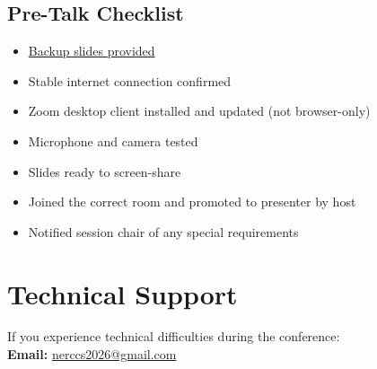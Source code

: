 \documentclass[11pt]{article}
\begin{document}
\subsection{Pre-Talk Checklist}
\begin{itemize}
	\item[$\square$] \href{https://forms.gle/S6GBNdRkcAE43YWo7}{Backup slides 
	provided} 
    \item[$\square$] Stable internet connection confirmed
    \item[$\square$] Zoom desktop client installed and updated (not browser-only)
    \item[$\square$] Microphone and camera tested
    \item[$\square$] Slides ready to screen-share
    \item[$\square$] Joined the correct room and promoted to presenter by host
    \item[$\square$] Notified session chair of any special requirements
\end{itemize}

\section{Technical Support}

If you experience technical difficulties during the conference:\\[0.3em]
\textbf{Email:} \href{mailto:nerccs2026@gmail.com}{nerccs2026@gmail.com}\\
\end{document}
